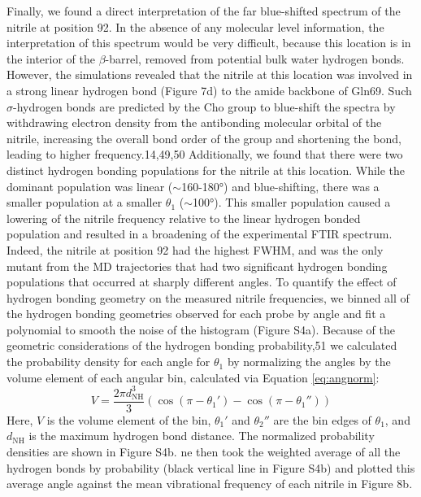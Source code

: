 Finally, we found a direct interpretation of the far blue-shifted spectrum of the nitrile at position 92.
In the absence of any molecular level information, the interpretation of this spectrum would be very difficult, because this location is in the interior of the $\beta$-barrel, removed from potential bulk water hydrogen bonds.
However, the simulations revealed that the nitrile at this location was involved in a strong linear hydrogen bond (Figure 7d) to the amide backbone of Gln69.
Such $\sigma$-hydrogen bonds are predicted by the Cho group to blue-shift the spectra by withdrawing electron density from the antibonding molecular orbital of the nitrile, increasing the overall bond order of the group and shortening the bond, leading to higher frequency.14,49,50
Additionally, we found that there were two distinct hydrogen bonding populations for the nitrile at this location.
While the dominant population was linear ($\sim$160-\ang{180}) and blue-shifting, there was a smaller population at a smaller $\theta_1$ ($\sim$\ang{100}).
This smaller population caused a lowering of the nitrile frequency relative to the linear hydrogen bonded population and resulted in a broadening of the experimental FTIR spectrum.
Indeed, the nitrile at position 92 had the highest FWHM, and was the only mutant from the MD trajectories that had two significant hydrogen bonding populations that occurred at sharply different angles. 
To quantify the effect of hydrogen bonding geometry on the measured nitrile frequencies, we binned all of the hydrogen bonding geometries observed for each probe by angle and fit a polynomial to smooth the noise of the histogram (Figure S4a).
Because of the geometric considerations of the hydrogen bonding probability,51 we calculated the probability density for each angle for $\theta_1$ by normalizing the angles by the volume element of each angular bin, calculated via Equation \ref{eq:angnorm}: 
\begin{equation}
    V = \frac{2\pi d^3_{\text{NH}}}{3}(\cos(\pi-\theta_1') - \cos(\pi - \theta_1'')) 
\end{equation}
Here, $V$ is the volume element of the bin, $\theta_1'$ and $\theta_2''$ are the bin edges of $\theta_1$, and $d_{\text{NH}}$ is the maximum hydrogen bond distance.
The normalized probability densities are shown in Figure S4b.
ne then took the weighted average of all the hydrogen bonds by probability (black vertical line in Figure S4b) and plotted this average angle against the mean vibrational frequency of each nitrile in Figure 8b. 

